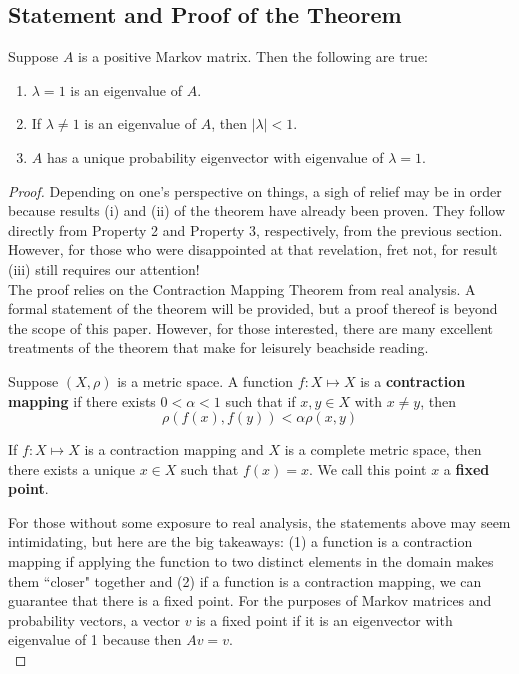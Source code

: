 \documentclass[10pt]{article}
\newenvironment{defn}[2][Definition:]{\begin{trivlist}
\item[\hskip \labelsep {\bfseries #1}\hskip \labelsep {\bfseries #2}]}{\end{trivlist}}
\newenvironment{theorem}[2][Theorem]{\begin{trivlist}
\item[\hskip \labelsep {\bfseries #1}\hskip \labelsep {\bfseries #2}]}{\end{trivlist}}
\begin{document}
\subsection{Statement and Proof of the Theorem}
\begin{theorem}{(Perron-Frobenius)}
Suppose $A$ is a positive Markov matrix. Then the following are true:
\begin{enumerate}
    \item[(i)] $\lambda=1$ is an eigenvalue of $A$.
    \item[(ii)] If $\lambda\neq 1$ is an eigenvalue of $A$, then $|\lambda|<1$.
    \item[(iii)] $A$ has a unique probability eigenvector with eigenvalue of $\lambda=1$.
\end{enumerate}
\end{theorem}
\begin{proof}
Depending on one's perspective on things, a sigh of relief may be in order because results (i) and (ii) of the theorem have already been proven. They follow directly from Property 2 and Property 3, respectively, from the previous section. However, for those who were disappointed at that revelation, fret not, for result (iii) still requires our attention!\vspace{0.5cm}\\
The proof relies on the Contraction Mapping Theorem from real analysis. A formal statement of the theorem will be provided, but a proof thereof is beyond the scope of this paper. However, for those interested, there are many excellent treatments of the theorem that make for leisurely beachside reading.
\begin{defn}{}
Suppose $(X,\rho)$ is a metric space. A function $f:X\mapsto X$ is a \textbf{contraction mapping} if there exists $0<\alpha<1$ such that if $x,y\in X$ with $x\neq y$, then 
\[\rho(f(x), f(y)) < \alpha \rho(x,y)\]
\end{defn}
\begin{theorem}{(Contraction Mapping)}
If $f:X\mapsto X$ is a contraction mapping and $X$ is a complete metric space, then there exists a unique $x\in X$ such that $f(x)=x$. We call this point $x$ a \textbf{fixed point}.
\end{theorem}
For those without some exposure to real analysis, the statements above may seem intimidating, but here are the big takeaways: (1) a function is a contraction mapping if applying the function to two distinct elements in the domain makes them ``closer" together and (2) if a function is a contraction mapping, we can guarantee that there is a fixed point. For the purposes of Markov matrices and probability vectors, a vector $v$ is a fixed point if it is an eigenvector with eigenvalue of 1 because then $Av = v$.\vspace{0.5cm}\\

\end{proof}
\end{document}
